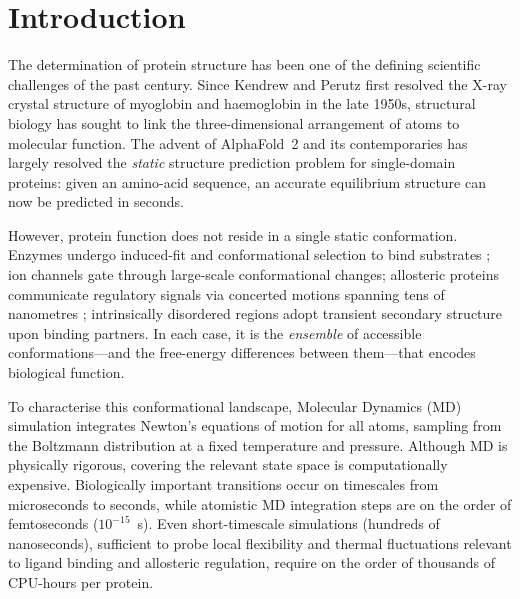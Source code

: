 \documentclass[12pt,a4paper]{article}
\begin{document}
\newpage
\tableofcontents
\newpage

\section{Introduction}
\label{sec:introduction}

The determination of protein structure has been one of the defining scientific challenges of
the past century.  Since Kendrew and Perutz first resolved the X-ray crystal structure of
myoglobin and haemoglobin in the late 1950s, structural biology has sought to link the
three-dimensional arrangement of atoms to molecular function.  The advent of AlphaFold~2
\citep{jumper2021} and its contemporaries \citep{baek2021} has largely resolved the
\emph{static} structure prediction problem for single-domain proteins: given an amino-acid
sequence, an accurate equilibrium structure can now be predicted in seconds.

However, protein function does not reside in a single static conformation.  Enzymes
undergo induced-fit and conformational selection to bind substrates \citep{benkovic2008};
ion channels gate through large-scale conformational changes; allosteric proteins
communicate regulatory signals via concerted motions spanning tens of nanometres
\citep{bernetti2024}; intrinsically disordered regions adopt transient secondary structure
upon binding partners.  In each case, it is the \emph{ensemble} of accessible
conformations---and the free-energy differences between them---that encodes biological
function.

To characterise this conformational landscape, Molecular Dynamics (MD) simulation
integrates Newton's equations of motion for all atoms, sampling from the Boltzmann
distribution at a fixed temperature and pressure.  Although MD is physically rigorous,
covering the relevant state space is computationally expensive.  Biologically important
transitions occur on timescales from microseconds to seconds, while atomistic MD
integration steps are on the order of femtoseconds ($10^{-15}$~s).  Even short-timescale
simulations (hundreds of nanoseconds), sufficient to probe local flexibility and
thermal fluctuations relevant to ligand binding and allosteric regulation, require on
the order of thousands of CPU-hours per protein.
\end{document}
